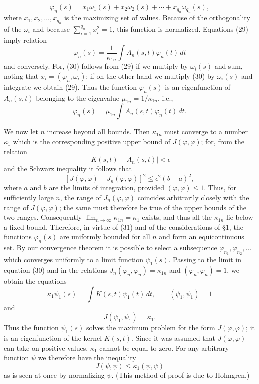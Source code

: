 \[
\varphi_n(s)=x_1\omega_1(s)+x_2\omega_2(s)+\cdots+x_{q_n}\omega_{q_n}(s),
\]
where $x_1,x_2,\ldots,x_{q_n}$ is the maximizing set of values. Because of the orthogonality of the $\omega_i$ and because $\sum_{i=1}^{q_n}x_i^2=1$, this function is normalized. Equations (29) imply relation
\begin{equation}\tag{30}
\varphi_n(s)=\frac{1}{\kappa_{1n}}\int A_n(s,t)\varphi_n(t)\,dt
\end{equation}
and conversely. For, (30) follows from (29) if we multiply by $\omega_i(s)$ and sum, noting that $x_i=(\varphi_n,\omega_i)$; if on the other hand we multiply (30) by $\omega_i(s)$ and integrate we obtain (29). Thus the function $\varphi_n(s)$ is an eigenfunction of $A_n(s,t)$ belonging to the eigenvalue $\mu_{1n}=1/\kappa_{1n}$, i.e.,
\begin{equation}\tag{31}
\varphi_n(s)=\mu_{1n}\int A_n(s,t)\varphi_n(t)\,dt.
\end{equation}

We now let $n$ increase beyond all bounds. Then $\kappa_{1n}$ must converge to a number $\kappa_1$ which is the corresponding positive upper bound of $J(\varphi,\varphi)$; for, from the relation
\[
|K(s,t)-A_n(s,t)|<\epsilon
\]
and the Schwarz inequality it follows that
\[
[J(\varphi,\varphi)-J_n(\varphi,\varphi)]^2\le\epsilon^2(b-a)^2,
\]
where $a$ and $b$ are the limits of integration, provided $(\varphi,\varphi)\le1$. Thus, for sufficiently large $n$, the range of $J_n(\varphi,\varphi)$ coincides arbitrarily closely with the range of $J(\varphi,\varphi)$; the same must therefore be true of the upper bounds of the two ranges. Consequently $\lim_{n\to\infty}\kappa_{1n}=\kappa_1$ exists, and thus all the $\kappa_{1n}$ lie below a fixed bound. Therefore, in virtue of (31) and of the considerations of \S1, the functions $\varphi_n(s)$ are uniformly bounded for all $n$ and form an equicontinuous set. By our convergence theorem it is possible to select a subsequence $\varphi_{n_1},\varphi_{n_2},\ldots$ which converges uniformly to a limit function $\psi_1(s)$. Passing to the limit in equation (30) and in the relations $J_n(\varphi_n,\varphi_n)=\kappa_{1n}$ and $(\varphi_n,\varphi_n)=1$, we obtain the equations
\begin{equation}\tag{32}
\kappa_1\psi_1(s)=\int K(s,t)\psi_1(t)\,dt,
\qquad (\psi_1,\psi_1)=1
\end{equation}
and
\begin{equation}\tag{33}
J(\psi_1,\psi_1)=\kappa_1.
\end{equation}
Thus the function $\psi_1(s)$ solves the maximum problem for the form $J(\varphi,\varphi)$; it is an eigenfunction of the kernel $K(s,t)$. Since it was assumed that $J(\varphi,\varphi)$ can take on positive values, $\kappa_1$ cannot be equal to zero. For any arbitrary function $\psi$ we therefore have the inequality
\begin{equation}\tag{34}
J(\psi,\psi)\le\kappa_1(\psi,\psi)
\end{equation}
as is seen at once by normalizing $\psi$. (This method of proof is due to Holmgren.)

